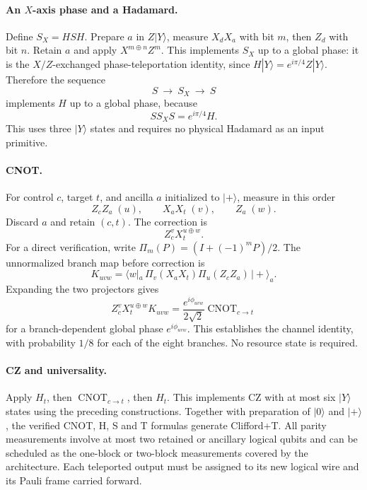 \documentclass[aps,prx,reprint,superscriptaddress,nofootinbib,floatfix,longbibliography]{revtex4-2}
\theoremstyle{definition}
\begin{document}
\paragraph{An $X$-axis phase and a Hadamard.}
Define $S_X=HSH$. Prepare $a$ in $Z|Y\rangle$, measure $X_dX_a$ with bit $m$, then $Z_d$ with bit $n$. Retain $a$ and apply $X^{m\oplus n}Z^m$. This implements $S_X$ up to a global phase: it is the $X/Z$-exchanged phase-teleportation identity, since $H|Y\rangle=e^{i\pi/4}Z|Y\rangle$. Therefore the sequence
\begin{equation}
 S\ \longrightarrow\ S_X\ \longrightarrow\ S
\end{equation}
implements $H$ up to a global phase, because
\begin{equation}
 SS_XS=e^{i\pi/4}H.
\end{equation}
This uses three $|Y\rangle$ states and requires no physical Hadamard as an input primitive.

\paragraph{CNOT.}
For control $c$, target $t$, and ancilla $a$ initialized to $|+\rangle$, measure in this order
\begin{equation}
 Z_cZ_a\;(u),\qquad X_aX_t\;(v),\qquad Z_a\;(w).
\end{equation}
Discard $a$ and retain $(c,t)$. The correction is
\begin{equation}
 Z_c^vX_t^{u\oplus w}.
\end{equation}
For a direct verification, write $\Pi_m(P)=(I+(-1)^mP)/2$. The unnormalized branch map before correction is
\begin{equation}
 K_{uvw}=\langle w|_a\,\Pi_v(X_aX_t)\Pi_u(Z_cZ_a)\,|+\rangle_a.
\end{equation}
Expanding the two projectors gives
\begin{equation}
 Z_c^vX_t^{u\oplus w}K_{uvw}
   =\frac{e^{i\phi_{uvw}}}{2\sqrt2}\operatorname{CNOT}_{c\to t}
\end{equation}
for a branch-dependent global phase $e^{i\phi_{uvw}}$. This establishes the channel identity, with probability $1/8$ for each of the eight branches. No resource state is required.

\paragraph{CZ and universality.}
Apply $H_t$, then $\operatorname{CNOT}_{c\to t}$, then $H_t$. This implements CZ with at most six $|Y\rangle$ states using the preceding constructions. Together with preparation of $|0\rangle$ and $|+\rangle$, the verified CNOT, H, S and T formulas generate Clifford+T. All parity measurements involve at most two retained or ancillary logical qubits and can be scheduled as the one-block or two-block measurements covered by the architecture. Each teleported output must be assigned to its new logical wire and its Pauli frame carried forward.
\end{document}

